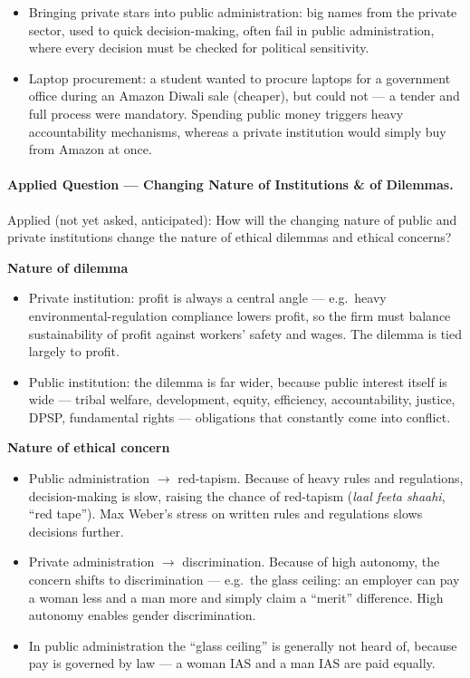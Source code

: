 \begin{ExampleBox}
\begin{itemize}
\item Bringing private stars into public administration: big names from the private sector, used to quick decision-making, often fail in public administration, where every decision must be checked for political sensitivity.
\item Laptop procurement: a student wanted to procure laptops for a government office during an Amazon Diwali sale (cheaper), but could not --- a tender and full process were mandatory. Spending public money triggers heavy accountability mechanisms, whereas a private institution would simply buy from Amazon at once.
\end{itemize}
\end{ExampleBox}

\paragraph{Applied Question --- Changing Nature of Institutions \& of Dilemmas.}
\begin{PYQLink}
Applied (not yet asked, anticipated): How will the changing nature of public and private institutions change the nature of ethical dilemmas and ethical concerns?
\end{PYQLink}

\textbf{Nature of dilemma}
\begin{itemize}
\item Private institution: profit is always a central angle --- e.g.\ heavy environmental-regulation compliance lowers profit, so the firm must balance sustainability of profit against workers' safety and wages. The dilemma is tied largely to profit.
\item Public institution: the dilemma is far wider, because public interest itself is wide --- tribal welfare, development, equity, efficiency, accountability, justice, DPSP, fundamental rights --- obligations that constantly come into conflict.
\end{itemize}

\textbf{Nature of ethical concern}
\begin{itemize}
\item Public administration $\rightarrow$ red-tapism. Because of heavy rules and regulations, decision-making is slow, raising the chance of red-tapism (\emph{laal feeta shaahi}, ``red tape''). Max Weber's stress on written rules and regulations slows decisions further.
\item Private administration $\rightarrow$ discrimination. Because of high autonomy, the concern shifts to discrimination --- e.g.\ the glass ceiling: an employer can pay a woman less and a man more and simply claim a ``merit'' difference. High autonomy enables gender discrimination.
\item In public administration the ``glass ceiling'' is generally not heard of, because pay is governed by law --- a woman IAS and a man IAS are paid equally.
\end{itemize}

